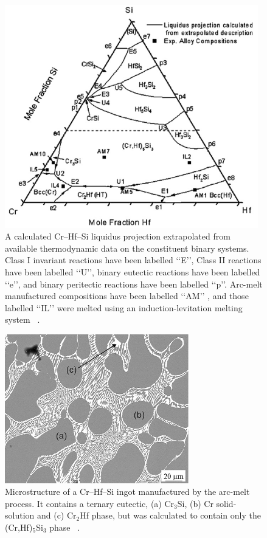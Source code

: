 %
\begin{figure}[H]
\begin{center}
\includegraphics[width=11cm]{crhfsi}
\caption{A calculated Cr–Hf–Si liquidus projection extrapolated from available thermodynamic data on the constituent binary systems.  Class I invariant reactions have been labelled ‘‘E’’, Class II reactions have been labelled ‘‘U’’, binary eutectic reactions have been labelled ‘‘e’’, and binary peritectic reactions have been labelled ‘‘p’’.  Arc-melt manufactured compositions have been labelled ‘‘AM’’ , and those labelled ‘‘IL’’ were melted using an induction-levitation melting system ~\cite{schoonover08}.}
\label{fig:crhfsi}
\end{center}
\end{figure}
%

%
\begin{figure}[H]
\begin{center}
\includegraphics[width=8cm]{crhfsieut}
\caption{ Microstructure of a Cr--Hf--Si ingot manufactured by the arc-melt process.  It contains a ternary eutectic, (a) Cr$_3$Si, (b) Cr solid-solution and (c) Cr$_2$Hf phase, but was calculated to contain only the (Cr,Hf)$_5$Si$_3$ phase ~\cite{schoonover08}.}
\label{fig:crhfsieut}
\end{center}
\end{figure}
%


